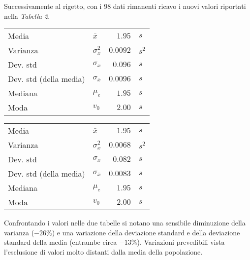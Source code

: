 \documentclass{article}
\begin{document}
	Successivamente al rigetto, con i $98$ dati rimanenti ricavo i nuovi valori riportati nella \textit{Tabella 2}.
	
	\vspace{0.8cm}
	\begin{minipage}[c]{0.45\textwidth}
		\centering
		\begin{tabular}{llrl}
			Media                       & $\bar{x}$             & $1.95$        & $s$       \\
			Varianza                    & $\sigma_{x}^2$          & $0.0092$     & $s^2$  \\
			Dev. std                    & $\sigma_{x}$              & $0.096$      & $s$   \\
			Dev. std (della media)      & $\sigma_{\bar{x}}$    & $0.0096$     & $s$    \\
			Mediana                     & $\mu_e$               & $1.95$        &  $s$      \\
			Moda                        & $v_0$                 & $2.00$        & $s$
		\end{tabular}
	\end{minipage}
	\begin{minipage}[c]{0.5\textwidth}
		\centering
		\begin{tabular}{llrl}
			Media                       & $\bar{x}$             & $1.95$        & $s$       \\
			Varianza                    & $\sigma_{x}^2$          & $0.0068$     & $s^2$  \\
			Dev. std                    & $\sigma_{x}$              & $0.082$      & $s$   \\
			Dev. std (della media)      & $\sigma_{\bar{x}}$    & $0.0083$     & $s$    \\
			Mediana                     & $\mu_e$               & $1.95$        &  $s$      \\
			Moda                        & $v_0$                 & $2.00$        & $s$
		\end{tabular}
	\end{minipage}
	\vspace{0.8cm}
	
	\noindent
	Confrontando i valori nelle due tabelle si notano una sensibile diminuzione della varianza ($-26 \%$) e una variazione della deviazione standard e della deviazione standard della media (entrambe circa $-13 \%$). Variazioni prevedibili vista l'esclusione di valori molto distanti dalla media della popolazione. \\
	
\end{document}
